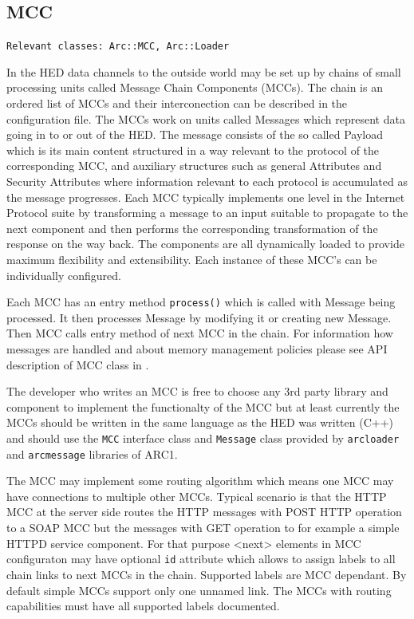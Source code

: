 \documentclass{book}
\begin{document}
\subsection{MCC}

\texttt{Relevant classes: Arc::MCC, Arc::Loader}

In the HED data channels to the outside world may be set up by chains of small processing units called Message Chain Components (MCCs). The chain is an ordered list of MCCs and their interconection can be described in the configuration file. The MCCs work on units called Messages which represent data going in to or out of the HED. The message consists of the so called Payload which is its main content structured in a way relevant to the protocol of the corresponding MCC, and auxiliary structures such as general Attributes and Security Attributes where information relevant to each protocol is accumulated as the message progresses. Each MCC typically implements one level in the Internet Protocol suite by transforming a message to an input suitable to propagate to the next component and then performs the corresponding transformation of the response on the way back. The components are all dynamically loaded to provide maximum flexibility and extensibility. Each instance of these MCC's can be individually configured.

Each MCC has an entry method \texttt{process()} which is called with Message being processed. It then processes Message by modifying it or creating new Message. Then MCC calls entry method of next MCC in the chain. For information how messages are handled and about memory management policies please see API description of MCC class in \cite{hed-api}.

The developer who writes an MCC is free to choose any 3rd party library and component to implement the functionalty of the MCC but at least currently the MCCs should be written in the same language as the HED was written (C++) and should use the \texttt{MCC} interface class and \texttt{Message} class provided by \texttt{arcloader} and \texttt{arcmessage} libraries of ARC1.

The MCC may implement some routing algorithm which means one MCC may have connections to multiple other MCCs. Typical scenario is that the HTTP MCC at the server side routes the HTTP messages with POST HTTP operation to a SOAP MCC but the messages with GET operation to for example a simple HTTPD service component. For that purpose <next> elements in MCC configuraton may have optional \texttt{id} attribute which allows to assign labels to all chain links to next MCCs in the chain. Supported labels are MCC dependant. By default simple MCCs support only one unnamed link. The MCCs with routing capabilities must have all supported labels documented.
\end{document}
